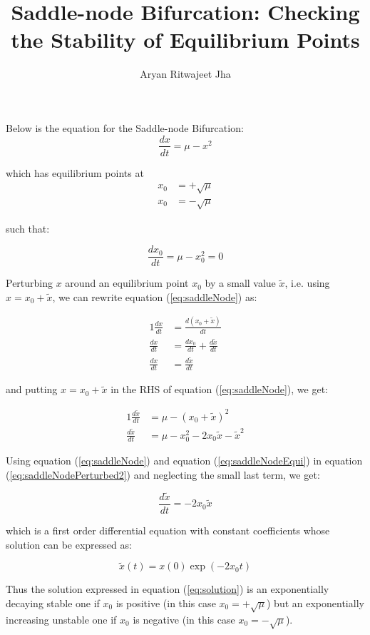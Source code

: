 \documentclass{article}
\begin{document}
	\title{Saddle-node Bifurcation: Checking the Stability of Equilibrium Points}
	\author{Aryan Ritwajeet Jha}
	\maketitle
	
	Below is the equation for the Saddle-node Bifurcation: 
	\begin{equation}
		\label{eq:saddleNode}
		\frac{dx}{dt} = \mu - x^2
	\end{equation}
	
	which has equilibrium points at	
	\begin{align*}
		x_0 &= +\sqrt\mu \\
		x_0 &= -\sqrt\mu
	\end{align*} 

	such that:
	
	\begin{equation}
		\label{eq:saddleNodeEqui}
		\frac{dx_0}{dt} = \mu - x_0^2 = 0 
	\end{equation}
	
	
	Perturbing $x$ around an equilibrium point $x_0$ by a small value $\tilde x$, i.e. using $x = x_0 + \tilde x$, we can rewrite equation (\ref{eq:saddleNode}) as:
	
	\begin{alignat}{1}
		\label{eq:saddleNodePerturbed}
		\frac{dx}{dt} &= \frac{d(x_0 + \tilde x)}{dt} \nonumber \\
		\frac{dx}{dt} &= \frac{dx_0}{dt} + \frac{d \tilde x}{dt} \\
		\frac{dx}{dt} &= \frac{d \tilde x}{dt} \nonumber
	\end{alignat}

	and putting $x = x_0 + \tilde x$ in the RHS of equation (\ref{eq:saddleNode}), we get:
	
	\begin{alignat}{1}
		\label{eq:saddleNodePerturbed2}
		\frac{d\tilde x}{dt} &= \mu - (x_0+\tilde x)^2 \nonumber \\
		\frac{d\tilde x}{dt} &= \mu - x_0^2 -2x_0\tilde x - \tilde x^2
	\end{alignat}
	
	Using equation (\ref{eq:saddleNode}) and equation (\ref{eq:saddleNodeEqui}) in equation (\ref{eq:saddleNodePerturbed2}) and neglecting the small last term, we get:
	
	\begin{equation}
		\frac{d\tilde x}{dt} = -2x_0\tilde x
	\end{equation}

	which is a first order differential equation with constant coefficients whose solution can be expressed as:

	\begin{equation}
		\label{eq:solution}
		\tilde{x}(t) = x(0)\exp{(-2x_0t)} 
	\end{equation}

	Thus the solution expressed in equation (\ref{eq:solution}) is an exponentially decaying stable one if $x_0$ is positive (in this case $x_0 = +\sqrt{\mu}$) but an exponentially increasing unstable one if $x_0$ is negative (in this case $x_0 = -\sqrt{\mu}$).
\end{document}
